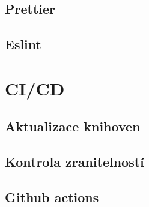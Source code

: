 \documentclass[12pt, a4paper,
 twoside,        %
 openright
]{report}
\begin{document}
\subsection{Prettier}
\subsection{Eslint}


\section{CI/CD}
\subsection{Aktualizace knihoven}
\subsection{Kontrola zranitelností}
\subsection{Github actions} 




 
\end{document}
